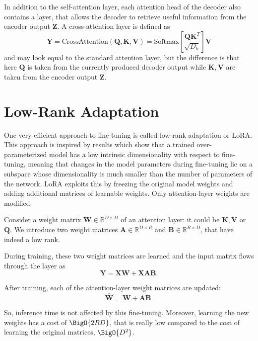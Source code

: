 In addition to the self-attention layer, each attention head of the decoder also contains a  layer, that allows the decoder to retrieve useful information from the encoder output \(\mathbf{Z}\).
A cross-attention layer is defined as
\[
\mathbf{Y}=\text{CrossAttention}(\mathbf{Q},\mathbf{K},\mathbf{V})=\text{Softmax}\left[\frac{\mathbf{Q}\mathbf{K}^{T}}{\sqrt{D_{k}}}\right]\mathbf{V}
\]
and may look equal to the standard attention layer, but the difference is that here \(\mathbf{Q}\) is taken from the currently produced decoder output  while \(\mathbf{K},\mathbf{V}\) are taken from the encoder output \(\mathbf{Z}\).

\section{Low-Rank Adaptation}
One very efficient approach to fine-tuning is called low-rank adaptation or LoRA.
This approach is inspired by results which show that a trained over-parameterized model has a low intrinsic dimensionality with respect to fine-tuning, meaning that changes in the model parameters during fine-tuning lie on a subspace whose dimensionality is much smaller than the number of parameters of the network.
LoRA exploits this by freezing the original model weights and adding additional matrices of learnable weights.
Only attention-layer weights are modified.

Consider a weight matrix \(\mathbf{W} \in \mathbb{R}^{D\times D}\) of an attention layer: it could be \(\mathbf{K},\mathbf{V}\) or \(\mathbf{Q}\).
We introduce two weight matrices \(\mathbf{A} \in \mathbb{R}^{D \times R}\) and \(\mathbf{B} \in \mathbb{R}^{R \times D}\), that have indeed a low rank.

During training, these two weight matrices are learned and the input matrix flows through the layer as
\[
\mathbf{Y} = \mathbf{X}\mathbf{W} + \mathbf{X}\mathbf{A}\mathbf{B}.
\]

After training, each of the attention-layer weight matrices are updated:
\[
\hat{\mathbf{W}} = \mathbf{W} + \mathbf{A}\mathbf{B}.
\]

So, inference time is not affected by this fine-tuning. 
Moreover, learning the new weights has a cost of \(\BigO{2RD}\), that is really low compared to the cost of learning the original matrices, \(\BigO{D^2}\).

